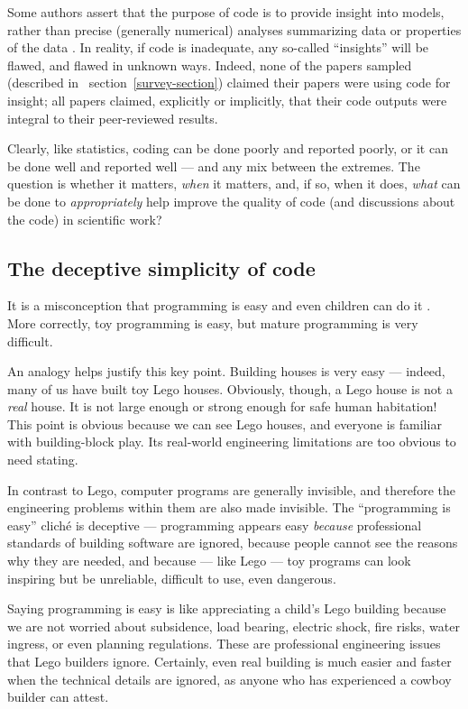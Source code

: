 \documentclass{comjnl}
\begin{document}
Some authors assert that the purpose of code is to provide insight into models, rather than precise (generally numerical) analyses summarizing data or properties of the data \cite{assessing-quality}. In reality, if code is inadequate, any so-called ``insights'' will be flawed, and flawed in unknown ways. Indeed, none of the papers sampled (described in \supplement\ section~\ref{survey-section}) claimed their papers were using code for insight; all papers claimed, explicitly or implicitly, that their code outputs were integral to their peer-reviewed results.

Clearly, like statistics, coding can be done poorly and reported poorly, or it can be done well and reported well --- and any mix between the extremes. The question is whether it matters, \emph{when\/} it matters, and, if so, when it does, \emph{what\/} can be done to \emph{appropriately\/} help improve the quality of code (and discussions about the code) in scientific work?

\subsection{The deceptive simplicity of code}\label{deceptive-simplicity-of-code}
It is a misconception that programming is easy and even children can do it \cite{fixit}. More correctly, toy programming is easy, but mature programming is very difficult.

An analogy helps justify this key point. Building houses is very easy --- indeed, many of us have built toy Lego houses. Obviously, though, a Lego house is not a \emph{real\/} house. It is not large enough or strong enough for safe human habitation! This point is obvious because we can see Lego houses, and everyone is familiar with building-block play. Its real-world engineering limitations are too obvious to need stating. 

In contrast to Lego, computer programs are generally invisible, and therefore the engineering problems within them are also made invisible. The ``programming is easy'' clich\' e is deceptive --- programming appears easy \emph{because\/} professional standards of building software are ignored, because people cannot see the reasons why they are needed, and because --- like Lego --- toy programs can look inspiring but be unreliable, difficult to use, even dangerous. 

Saying programming is easy is like appreciating a child's Lego building because we are not worried about subsidence, load bearing, electric shock, fire risks, water ingress, or even planning regulations. These are professional engineering issues that Lego builders ignore. Certainly, even real building is much easier and faster when the technical details are ignored, as anyone who has experienced a cowboy builder can attest.
\end{document}
